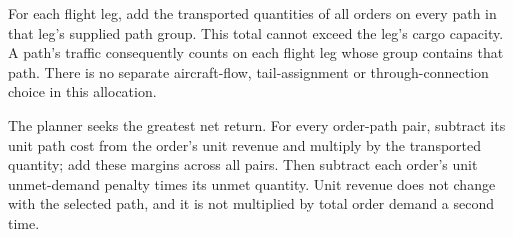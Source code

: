 \documentclass[10pt]{article}
\begin{document}
For each flight leg, add the transported quantities of all orders on every path in that leg's supplied path group. This total cannot exceed the leg's cargo capacity. A path's traffic consequently counts on each flight leg whose group contains that path. There is no separate aircraft-flow, tail-assignment or through-connection choice in this allocation.

The planner seeks the greatest net return. For every order-path pair, subtract its unit path cost from the order's unit revenue and multiply by the transported quantity; add these margins across all pairs. Then subtract each order's unit unmet-demand penalty times its unmet quantity. Unit revenue does not change with the selected path, and it is not multiplied by total order demand a second time.
\end{document}
